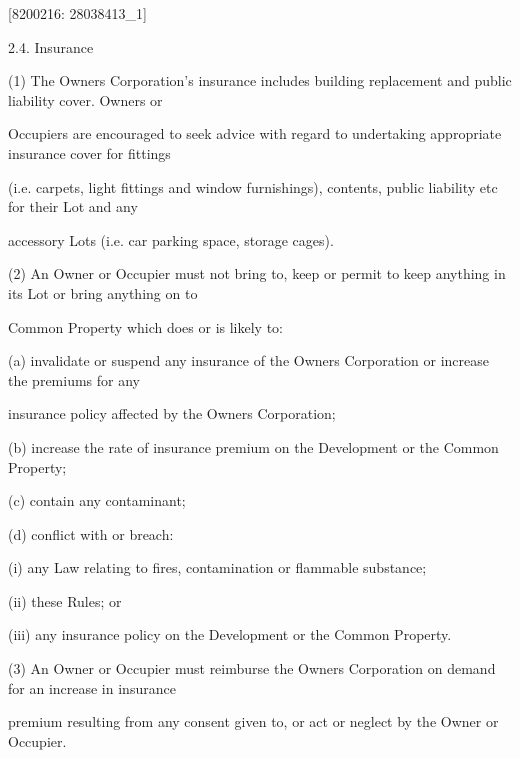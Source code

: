 \documentclass{article}
\begin{document}
\newpage
















{\fontsize{7.02}{1}[8200216: 28038413\_1] }

{\fontsize{9.99}{1}2.4. Insurance }


{\fontsize{9.962}{1}(1) The Owners Corporation’s insurance includes building replacement and public liability cover. Owners or }

{\fontsize{10.02}{1}Occupiers are encouraged to seek advice with regard to undertaking appropriate insurance cover for fittings }

{\fontsize{10.02}{1}(i.e. carpets, light fittings and window furnishings), contents, public liability etc for their Lot and any }

{\fontsize{10.02}{1}accessory Lots (i.e. car parking space, storage cages). }

{\fontsize{9.962}{1}(2) An Owner or Occupier must not bring to, keep or permit to keep anything in its Lot or bring anything on to }

{\fontsize{10.02}{1}Common Property which does or is likely to: }

{\fontsize{9.962}{1}(a) invalidate or suspend any insurance of the Owners Corporation or increase the premiums for any }

{\fontsize{10.02}{1}insurance policy affected by the Owners Corporation; }

{\fontsize{9.962}{1}(b) increase the rate of insurance premium on the Development or the Common Property; }

{\fontsize{9.962}{1}(c) contain any contaminant; }

{\fontsize{9.962}{1}(d) conflict with or breach: }

{\fontsize{9.962}{1}(i) any Law relating to fires, contamination or flammable substance; }

{\fontsize{9.962}{1}(ii) these Rules; or }

{\fontsize{9.962}{1}(iii) any insurance policy on the Development or the Common Property. }

{\fontsize{9.962}{1}(3) An Owner or Occupier must reimburse the Owners Corporation on demand for an increase in insurance }

{\fontsize{10.02}{1}premium resulting from any consent given to, or act or neglect by the Owner or Occupier. }
\end{document}
